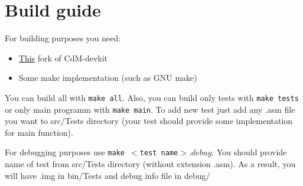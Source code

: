 \chapter*{Build guide}

For building purposes you need:

\begin{itemize}
	\item \href{https://github.com/Proletcultist/cdm-devkit-macro-improvements}{This} fork of CdM-devkit
	\item Some make implementation (such as GNU make)
\end{itemize}

You can build all with \texttt{make all}. Also, you can build only tests with \texttt{make tests} or only main programm with \texttt{make main}. To add new test just add any .asm file you want to src/Tests directory (your test should provide some implementation for main function).

For debugging purposes use \texttt{make $<$test name$>.debug$}. You should provide name of test from src/Tests directory (without extension .asm). As a result, you will have .img in bin/Tests and debug info file in debug/
